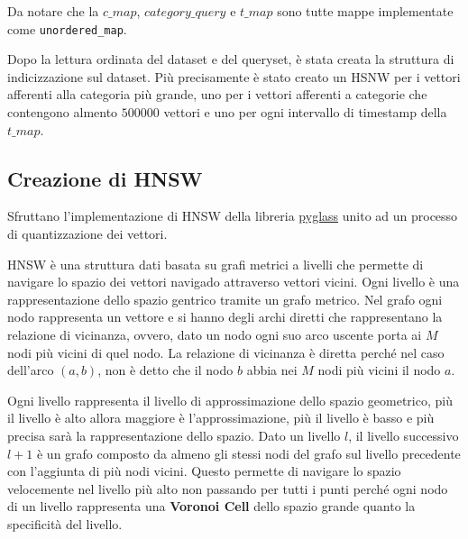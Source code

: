 Da notare che la $c\_map$, $category\_query$ e $t\_map$ sono tutte mappe implementate 
come \texttt{unordered\_map}.

Dopo la lettura ordinata del dataset e del queryset, è stata creata la struttura 
di indicizzazione sul dataset. Più precisamente è stato creato un HSNW per i vettori 
afferenti alla categoria più grande, uno per i vettori afferenti a categorie che 
contengono almento $500000$ vettori e uno per ogni intervallo di timestamp della 
$t\_map$. 

\subsection{Creazione di HNSW}
Sfruttano l'implementazione di HNSW della libreria \href{https://github.com/zilliztech/pyglass/tree/master}{pyglass}
unito ad un processo di quantizzazione dei vettori.

HNSW è una struttura dati basata su grafi metrici a livelli che permette di navigare
lo spazio dei vettori navigado attraverso vettori vicini. Ogni livello è una 
rappresentazione dello spazio gentrico tramite un grafo metrico. Nel grafo ogni nodo rappresenta 
un vettore e si hanno degli archi diretti che rappresentano la relazione di vicinanza,
ovvero, dato un nodo ogni suo arco uscente porta ai $M$ nodi più vicini di quel nodo. La relazione 
di vicinanza è diretta perché nel caso dell'arco $(a,b)$, non è detto che il nodo 
$b$ abbia nei $M$ nodi più vicini il nodo $a$.

Ogni livello rappresenta il livello di approssimazione dello spazio geometrico, 
più il livello è alto allora maggiore è l'approssimazione, più il livello è basso 
e più precisa sarà la rappresentazione dello spazio. Dato un livello $l$, il livello 
successivo $l+1$ è un grafo composto da almeno gli stessi nodi del grafo sul livello 
precedente con l'aggiunta di più nodi vicini. Questo permette di navigare 
lo spazio velocemente nel livello più alto non passando per tutti i punti perché 
ogni nodo di un livello rappresenta una \textbf{Voronoi Cell} dello spazio grande 
quanto la specificità del livello. 

